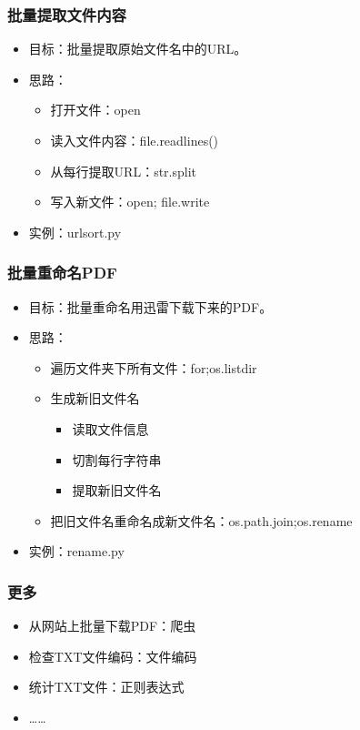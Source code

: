 \documentclass[13pt]{beamer}
\begin{document}
\begin{frame}
\frametitle{批量提取文件内容}
\begin{itemize}
  \item<1-> 目标：批量提取原始文件名中的URL。
  \item<2-> 思路：
  \pause
  \begin{itemize}
    \item 打开文件：open
    \pause
    \item 读入文件内容：file.readlines()
    \pause
    \item 从每行提取URL：str.split
    \pause
    \item 写入新文件：open; file.write
   \end{itemize}
  \item<3-> 实例：urlsort.py

\end{itemize}
\end{frame}

\begin{frame}
\frametitle{批量重命名PDF}
\begin{itemize}
  \item<1-> 目标：批量重命名用迅雷下载下来的PDF。
  \item<2-> 思路：
  \begin{itemize}
    \pause
    \item 遍历文件夹下所有文件：for;os.listdir
    \pause
    \item 生成新旧文件名
    
    \begin{itemize}
      \pause
      \item 读取文件信息
      \pause
      \item 切割每行字符串
      \pause
      \item 提取新旧文件名
    \end{itemize}
    \pause
    \item 把旧文件名重命名成新文件名：os.path.join;os.rename
   \end{itemize}
  \item<3-> 实例：rename.py
\end{itemize}
\end{frame}

\begin{frame}
\frametitle{更多}
\begin{itemize}
\item<1-> 从网站上批量下载PDF：爬虫
\item<2-> 检查TXT文件编码：文件编码
\item<3-> 统计TXT文件：正则表达式
\item ……
\end{itemize}
\end{frame}
\end{document}
